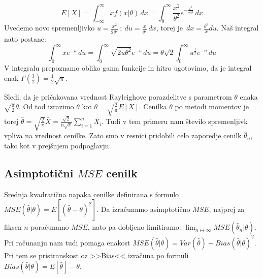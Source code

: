\documentclass[a4paper, 10pt]{article}
\begin{document}
	\begin{equation*}
		E\left[X\right] = \int_{-\infty}^{\infty}x f(x|\theta)\,dx = \int_{0}^{\infty} \frac{x^2}{\theta^2}e^{-\frac{x^2}{2\theta^2}}\,dx
	\end{equation*}
	Uvedemo novo spremenljivko $u =\frac{x^2}{2\theta^2}~;~du = \frac{x}{\theta^2}\,dx$, torej je~$dx = \frac{\theta^2}{x} du$. Naš integral nato postane:
	\begin{equation*}
		\int_{0}^{\infty} x e^{-u}\,du = \int_{0}^{\infty} \sqrt{2u\theta^2} e^{-u}\,du = \theta\sqrt{2} \int_{0}^{\infty} u^{\frac{1}{2}}e^{-u}\,du
	\end{equation*}
	V integralu prepoznamo obliko gama funkcije in hitro ugotovimo, da je integral enak $\Gamma(\frac{3}{2}) = \frac{1}{2}\sqrt{\pi}$.
	
	Sledi, da je pričakovana vrednost Rayleighove porazdelitve s parametrom $\theta$ enaka $\sqrt{\frac{\pi}{2}}\theta$. Od tod izrazimo $\theta$ kot $\theta = \sqrt{\frac{2}{\pi}}E\left[X\right]$. Cenilka $\theta$ po metodi momentov je torej $\widehat{\theta} = \sqrt{\frac{2}{\pi}}\bar{X} = \frac{\sqrt{2}}{n\sqrt{\pi}}\sum_{i=1}^{n}X_i$.
	Tudi v tem primeru nam število spremenljivk vpliva na vrednost cenilke. Zato smo v resnici pridobili celo zaporedje cenilk $\widehat{\theta}_n$, tako kot v prejšnjem podpoglavju.

	\subsection{Asimptotični $MSE$ cenilk}\label{subsect: 2C}
	Srednja kvadratična napaka cenilke definirana s formulo $MSE(\widehat{\theta}|\theta) = E[(\widehat{\theta} - \theta)^2]$. Da izračunamo asimptotično $MSE$, najprej za fiksen $n$ poračunamo $MSE$, nato pa dobljeno limitiramo: $\lim_{n\mapsto\infty}MSE(\widehat{\theta}_n | \theta)$. Pri računanju nam tudi pomaga enakost $MSE(\widehat{\theta} | \theta) = Var(\widehat{\theta}) + Bias(\widehat{\theta}|\theta)^2$.
	Pri tem se pristranskost oz >>Bias<< izračuna po formuli $Bias(\widehat{\theta}|\theta) = E[\widehat{\theta}] - \theta$.
\end{document}
